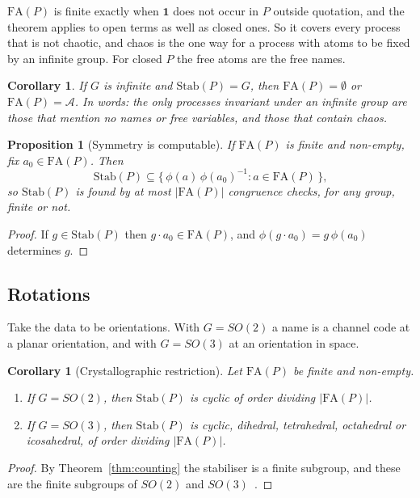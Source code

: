 \documentclass[11pt]{article}
\newtheorem{proposition}[theorem]{Proposition}
\newtheorem{corollary}[theorem]{Corollary}
\theoremstyle{definition}
\theoremstyle{remark}
\newcommand{\chaos}{\mathbf{1}}
\newcommand{\act}[2]{#1\cdot #2}
\newcommand{\Stab}{\mathrm{Stab}}
\newcommand{\FA}{\mathrm{FA}}
\newcommand{\Atoms}{\mathcal{A}}
\begin{document}
$\FA(P)$ is finite exactly when $\chaos$ does not occur in $P$ outside
quotation, and the theorem applies to open terms as well as closed ones. So
it covers every process that is not chaotic, and chaos is the one way for a
process with atoms to be fixed by an infinite group. For closed $P$ the free
atoms are the free names.

\begin{corollary}\label{cor:infinite}
If $G$ is infinite and $\Stab(P)=G$, then $\FA(P)=\emptyset$ or
$\FA(P)=\Atoms$. In words: the only processes invariant under an infinite
group are those that mention no names or free variables, and those that
contain chaos.
\end{corollary}

\begin{proposition}[Symmetry is computable]\label{prop:computable}
If $\FA(P)$ is finite and non-empty, fix $a_0\in\FA(P)$. Then
\[
\Stab(P)\subseteq\{\,\phi(a)\,\phi(a_0)^{-1} : a\in\FA(P)\,\},
\]
so $\Stab(P)$ is found by at most $|\FA(P)|$ congruence checks, for any group,
finite or not.
\end{proposition}

\begin{proof}
If $g\in\Stab(P)$ then $\act{g}{a_0}\in\FA(P)$, and
$\phi(\act{g}{a_0})=g\,\phi(a_0)$ determines $g$.
\end{proof}

\subsection{Rotations}

Take the data to be orientations. With $G=SO(2)$ a name is a channel code at a
planar orientation, and with $G=SO(3)$ at an orientation in space.

\begin{corollary}[Crystallographic restriction]\label{cor:crystal}
Let $\FA(P)$ be finite and non-empty.
\begin{enumerate}[label=(\roman*)]
\item If $G=SO(2)$, then $\Stab(P)$ is cyclic of order dividing $|\FA(P)|$.
\item If $G=SO(3)$, then $\Stab(P)$ is cyclic, dihedral, tetrahedral,
  octahedral or icosahedral, of order dividing $|\FA(P)|$.
\end{enumerate}
\end{corollary}

\begin{proof}
By Theorem~\ref{thm:counting} the stabiliser is a finite subgroup, and these
are the finite subgroups of $SO(2)$ and $SO(3)$~\cite{armstrong}.
\end{proof}
\end{document}
